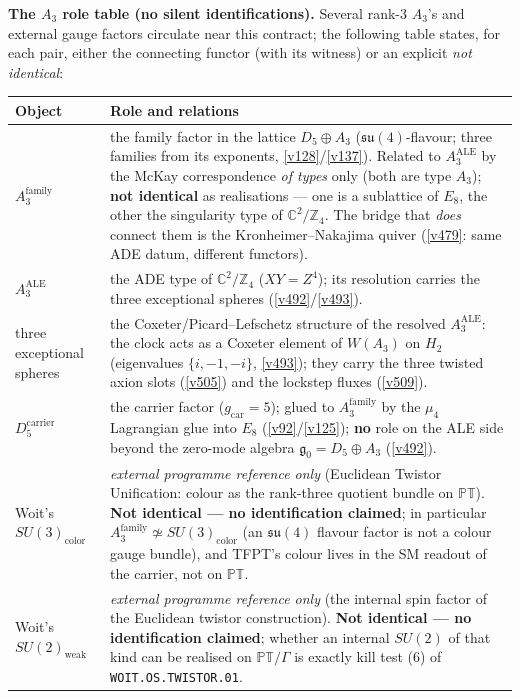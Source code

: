 \documentclass[11pt,a4paper]{article}
\newcommand{\Z}{\mathbb Z}
\begin{document}
\par\smallskip\noindent\textbf{The $A_3$ role table (no silent identifications).} Several rank-$3$
$A_3$'s and external gauge factors circulate near this contract; the following table states, for
each pair, either the connecting functor (with its witness) or an explicit \emph{not identical}:
\begin{center}\footnotesize
\renewcommand{\arraystretch}{1.22}
\begin{tabularx}{\linewidth}{@{}lY@{}}
\toprule
\textbf{Object} & \textbf{Role and relations} \\
\midrule
$A_3^{\mathrm{family}}$ & the family factor in the lattice $D_5{\oplus}A_3$
($\mathfrak{su}(4)$-flavour; three families from its exponents, \vref{v128}/\vref{v137}). Related
to $A_3^{\mathrm{ALE}}$ by the McKay correspondence \emph{of types} only (both are type $A_3$);
\textbf{not identical} as realisations --- one is a sublattice of $E_8$, the other the singularity
type of $\mathbb C^2/\Z_4$. The bridge that \emph{does} connect them is the Kronheimer--Nakajima
quiver (\vref{v479}: same ADE datum, different functors). \\
$A_3^{\mathrm{ALE}}$ & the ADE type of $\mathbb C^2/\Z_4$ ($XY=Z^4$); its resolution carries the
three exceptional spheres (\vref{v492}/\vref{v493}). \\
three exceptional spheres & the Coxeter/Picard--Lefschetz structure of the resolved $A_3^{\mathrm{ALE}}$:
the clock acts as a Coxeter element of $W(A_3)$ on $H_2$ (eigenvalues $\{i,-1,-i\}$, \vref{v493});
they carry the three twisted axion slots (\vref{v505}) and the lockstep fluxes (\vref{v509}). \\
$D_5^{\mathrm{carrier}}$ & the carrier factor ($g_{\mathrm{car}}=5$); glued to $A_3^{\mathrm{family}}$
by the $\mu_4$ Lagrangian glue into $E_8$ (\vref{v92}/\vref{v125}); \textbf{no} role on the ALE side
beyond the zero-mode algebra $\mathfrak g_0=D_5{\oplus}A_3$ (\vref{v492}). \\
Woit's $SU(3)_{\mathrm{color}}$ & \emph{external programme reference only} (Euclidean Twistor
Unification: colour as the rank-three quotient bundle on $\mathbb{PT}$).
\textbf{Not identical --- no identification claimed}; in particular
$A_3^{\mathrm{family}}\not\simeq SU(3)_{\mathrm{color}}$ (an $\mathfrak{su}(4)$ flavour factor is
not a colour gauge bundle), and TFPT's colour lives in the SM readout of the carrier, not on
$\mathbb{PT}$. \\
Woit's $SU(2)_{\mathrm{weak}}$ & \emph{external programme reference only} (the internal spin factor
of the Euclidean twistor construction). \textbf{Not identical --- no identification claimed}; whether
an internal $SU(2)$ of that kind can be realised on $\mathbb{PT}/\Gamma$ is exactly kill test (6)
of \texttt{WOIT.OS.TWISTOR.01}. \\
\bottomrule
\end{tabularx}
\end{center}
\end{document}
